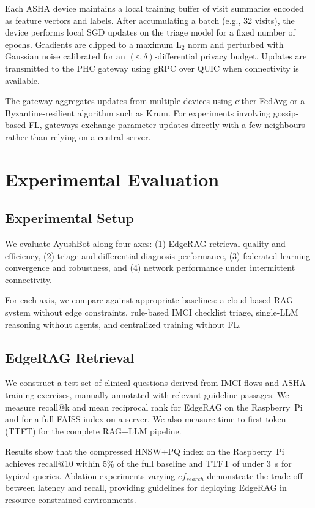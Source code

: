\documentclass[conference]{IEEEtran}
\begin{document}
Each ASHA device maintains a local training buffer of visit summaries encoded as feature vectors and labels. After accumulating a batch (e.g., 32 visits), the device performs local SGD updates on the triage model for a fixed number of epochs. Gradients are clipped to a maximum L$_2$ norm and perturbed with Gaussian noise calibrated for an $(\varepsilon,\delta)$-differential privacy budget. Updates are transmitted to the PHC gateway using gRPC over QUIC when connectivity is available.

The gateway aggregates updates from multiple devices using either FedAvg or a Byzantine-resilient algorithm such as Krum. For experiments involving gossip-based FL, gateways exchange parameter updates directly with a few neighbours rather than relying on a central server.

\section{Experimental Evaluation}

\subsection{Experimental Setup}

We evaluate AyushBot along four axes: (1) EdgeRAG retrieval quality and efficiency, (2) triage and differential diagnosis performance, (3) federated learning convergence and robustness, and (4) network performance under intermittent connectivity.

For each axis, we compare against appropriate baselines: a cloud-based RAG system without edge constraints, rule-based IMCI checklist triage, single-LLM reasoning without agents, and centralized training without FL.

\subsection{EdgeRAG Retrieval}

We construct a test set of clinical questions derived from IMCI flows and ASHA training exercises, manually annotated with relevant guideline passages. We measure recall@k and mean reciprocal rank for EdgeRAG on the Raspberry~Pi and for a full FAISS index on a server. We also measure time-to-first-token (TTFT) for the complete RAG+LLM pipeline.

Results show that the compressed HNSW+PQ index on the Raspberry~Pi achieves recall@10 within 5\% of the full baseline and TTFT of under 3~s for typical queries. Ablation experiments varying $ef_{search}$ demonstrate the trade-off between latency and recall, providing guidelines for deploying EdgeRAG in resource-constrained environments.
\end{document}
